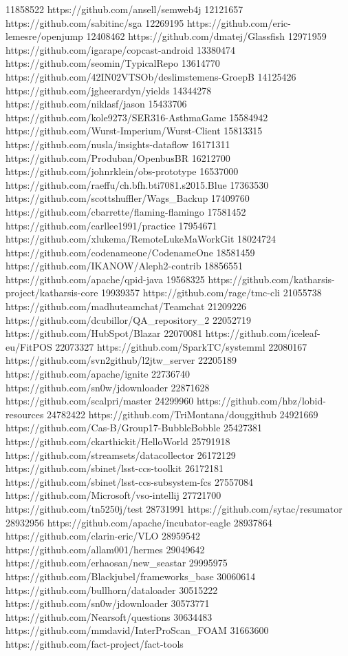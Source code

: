 11858522	https://github.com/ansell/semweb4j
12121657	https://github.com/sabitinc/sga
12269195	https://github.com/eric-lemesre/openjump
12408462	https://github.com/dmatej/Glassfish
12971959	https://github.com/igarape/copcast-android
13380474	https://github.com/seomin/TypicalRepo
13614770	https://github.com/42IN02VTSOb/deslimstemens-GroepB
14125426	https://github.com/jgheerardyn/yields
14344278	https://github.com/niklasf/jason
15433706	https://github.com/kole9273/SER316-AsthmaGame
15584942	https://github.com/Wurst-Imperium/Wurst-Client
15813315	https://github.com/nusla/insights-dataflow
16171311	https://github.com/Produban/OpenbusBR
16212700	https://github.com/johnrklein/obs-prototype
16537000	https://github.com/raeffu/ch.bfh.bti7081.s2015.Blue
17363530	https://github.com/scottshuffler/Wags_Backup
17409760	https://github.com/cbarrette/flaming-flamingo
17581452	https://github.com/carllee1991/practice
17954671	https://github.com/xlukema/RemoteLukeMaWorkGit
18024724	https://github.com/codenameone/CodenameOne
18581459	https://github.com/IKANOW/Aleph2-contrib
18856551	https://github.com/apache/qpid-java
19568325	https://github.com/katharsis-project/katharsis-core
19939357	https://github.com/rage/tmc-cli
21055738	https://github.com/madhuteamchat/Teamchat
21209226	https://github.com/dcubillor/QA_repository_2
22052719	https://github.com/HubSpot/Blazar
22070081	https://github.com/iceleaf-eu/FitPOS
22073327	https://github.com/SparkTC/systemml
22080167	https://github.com/svn2github/l2jtw_server
22205189	https://github.com/apache/ignite
22736740	https://github.com/sn0w/jdownloader
22871628	https://github.com/scalpri/master
24299960	https://github.com/hbz/lobid-resources
24782422	https://github.com/TriMontana/douggithub
24921669	https://github.com/Cas-B/Group17-BubbleBobble
25427381	https://github.com/ckarthickit/HelloWorld
25791918	https://github.com/streamsets/datacollector
26172129	https://github.com/sbinet/lsst-ccs-toolkit
26172181	https://github.com/sbinet/lsst-ccs-subsystem-fcs
27557084	https://github.com/Microsoft/vso-intellij
27721700	https://github.com/tn5250j/test
28731991	https://github.com/sytac/resumator
28932956	https://github.com/apache/incubator-eagle
28937864	https://github.com/clarin-eric/VLO
28959542	https://github.com/allam001/hermes
29049642	https://github.com/erhaosan/new_seastar
29995975	https://github.com/Blackjubel/frameworks_base
30060614	https://github.com/bullhorn/dataloader
30515222	https://github.com/sn0w/jdownloader
30573771	https://github.com/Nearsoft/questions
30634483	https://github.com/mmdavid/InterProScan_FOAM
31663600	https://github.com/fact-project/fact-tools
